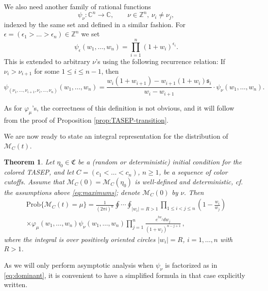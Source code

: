 \documentclass[11pt,reqno]{amsart}
\newtheorem{thm}{Theorem}[section]
\theoremstyle{definition}
\theoremstyle{remark}
\theoremstyle{remark}
\def\leq{\leqslant}
\def\geq{\geqslant}
\def\C{\mathcal{C}}
\renewcommand\le{\leq}
\renewcommand\ge{\geq}
\def\Z{\mathbb Z}
\def\C{\mathbb C}
\def\M{\mathcal M}
\numberwithin{equation}{section}
\begin{document}
	We also need another family of rational functions
	$$
	\psi_\nu: \C^n \to \C, \qquad \nu\in \Z^n,\  \nu_i\ne \nu_j,
	$$
	indexed by the same set and defined in a similar fashion. For $\epsilon=(\epsilon_1>\dots>\epsilon_n)\in\Z^n$ we set
	\begin{equation}\label{eq:dominant}
		\psi_{\epsilon}(w_1,\dots,w_n)=\prod_{i=1}^n (1+w_i)^{\epsilon_i}.
	\end{equation}
	This is extended to arbitrary $\nu$'s using the following recurrence relation: If $\nu_i>\nu_{i+1}$ for some $1\le i\le n-1$, then 
	\begin{equation}
		\label{eq:psi-exchange}
		\psi_{(\nu_1,\dots,\nu_{i+1},\nu_i,\dots,\nu_n)}(w_1,\dots,w_n)=\frac{w_i(1+w_{i+1})-w_{i+1}(1+w_i)\mathfrak s_i}{w_{i}-w_{i+1}}\cdot\psi_\nu(w_1,\dots,w_n).
	\end{equation}
	
	As for $\varphi_\mu$'s, the correctness of this definition is not obvious, and it will follow from the proof of Proposition \ref{prop:TASEP-transition}.
	
	We are now ready to state an integral representation for the distribution of $\M_C(t)$.  
	
	\begin{thm} \label{thm:integral}
		Let $\eta_0\in\mathfrak C$ be a (random or deterministic) initial condition for the colored TASEP, and let $C=(c_1<\dots<c_n)$, $n\ge 1$, be a sequence of color cutoffs. Assume that $\M_C(0)=\M_C(\eta_0)$ is well-defined and deterministic, cf. the assumptions above \eqref{eq:maximums}; denote $\M_C(0)$ by $\nu$. Then 
		\begin{equation}\label{eq:integral}
			\begin{gathered}
				\mathrm{Prob}\{\M_C(t)=\mu\}=\frac{1}{(2\pi i)^n}\oint\cdots\oint_{|w_i|=R>1} \prod_{1\le i<j\le n} \left(1-\frac{w_i}{w_j}\right) \\ \times \varphi_\mu(w_1,\dots,w_n)\psi_\nu(w_1,\dots,w_n)\prod_{j=1}^n \frac{e^{tw_j} dw_j}{(1+w_j)^{n-j+1}}\,,
			\end{gathered}
		\end{equation}
		where the integral is over positively oriented circles $|w_i|=R$, $i=1,\dots,n$ with $R>1$. 
	\end{thm}
	
	As we will only perform asymptotic analysis when $\psi_\nu$ is factorized as in \eqref{eq:dominant}, it is convenient to have a simplified formula in that case explicitly written. 
	
\end{document}
